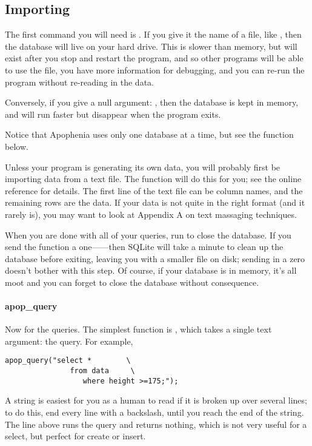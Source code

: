 \subsection{Importing}
The first command you will need is . If you give
it the name of a file, like , then the
database will live on your hard drive. This is slower than memory, but
will exist after you stop and restart the program, and so other programs
will be able to use the file, you have more information for debugging,
and you can re-run the program without re-reading in the data.

Conversely, if you give a null argument: ,
then the database is kept in memory, and will run faster but 
disappear when the program exits.

Notice that Apophenia uses only one database at a time, but
see the  function below.

Unless your program is generating its own data, you will probably
first be importing data from a text file.  The 
function will do this for you; see the online reference for details. The
first line of the text file can be column names, and the remaining rows
are the data. If your data is not quite in the right format (and it
rarely is), you may want to look at Appendix A on text
massaging techniques.

When you are done with all of your queries, run
 to close the database. If you send the function a
one------then SQLite will take a minute to clean
up the database before exiting, leaving you with a smaller file on disk;
sending in a zero doesn't bother with this step. Of course, if your
database is in memory, it's all moot and you can forget to close the
database without consequence.


\paragraph{apop\_query} Now for the queries. The simplest function
is , which takes a single text argument: the
query. For example,
\setc {}
\begin{lstlisting}
apop_query("select *        \
               from data     \
                  where height >=175;");
\end{lstlisting}

A string is easiest for you as a human to read if it is
broken up over several lines; to do this, end every line with a
backslash, until you reach the end of the string. The line above runs
the query and returns nothing, which is not very useful for a \si{select}, but perfect for
\si{create} or \si{insert}.

